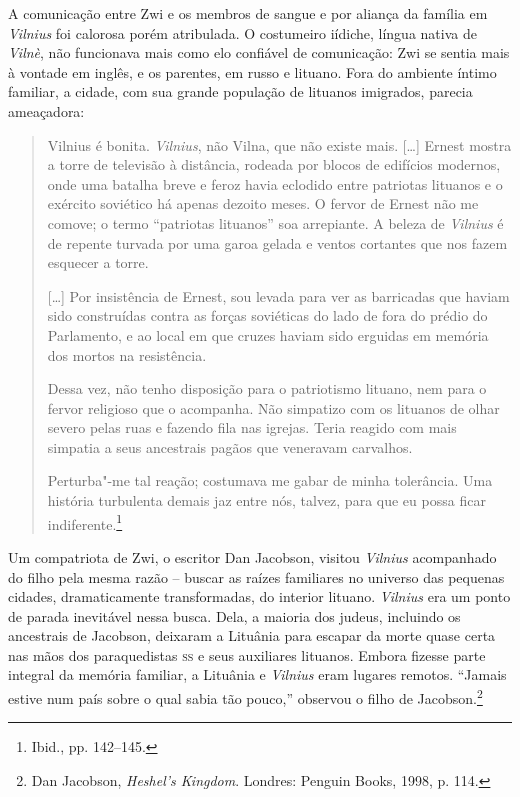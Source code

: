 A comunicação entre Zwi e os membros de sangue e por aliança da família
em \textit{Vilnius} foi calorosa porém atribulada. O costumeiro iídiche, língua
nativa de \textit{Vilnè}, não funcionava mais como elo confiável de comunicação:
Zwi se sentia mais à vontade em inglês, e os parentes, em russo e
lituano. Fora do ambiente íntimo familiar, a cidade, com sua grande
população de lituanos imigrados, parecia ameaçadora:

\begin{quote}
Vilnius é bonita. \textit{Vilnius}, não Vilna, que não existe mais.
[\ldots{}] Ernest mostra a torre de televisão à distância, rodeada por
blocos de edifícios modernos, onde uma batalha breve e feroz havia
eclodido entre patriotas lituanos e o exército soviético há apenas
dezoito meses. O fervor de Ernest não me comove; o termo ``patriotas
lituanos'' soa arrepiante. A beleza de \textit{Vilnius} é de repente turvada por
uma garoa gelada e ventos cortantes que nos fazem esquecer a torre.

[\ldots{}] Por insistência de Ernest, sou levada para ver as barricadas
que haviam sido construídas contra as forças soviéticas do lado de fora
do prédio do Parlamento, e ao local em que cruzes haviam sido erguidas
em memória dos mortos na resistência.

Dessa vez, não tenho disposição para o patriotismo lituano, nem para o
fervor religioso que o acompanha. Não simpatizo com os lituanos de olhar
severo pelas ruas e fazendo fila nas igrejas. Teria reagido com mais
simpatia a seus ancestrais pagãos que veneravam carvalhos.

Perturba"-me tal reação; costumava me gabar de minha tolerância. Uma
história turbulenta demais jaz entre nós, talvez, para que eu possa
ficar indiferente.\footnote{Ibid., pp. 142--145.}
\end{quote}

Um compatriota de Zwi, o escritor Dan Jacobson, visitou \textit{Vilnius}
acompanhado do filho pela mesma razão -- buscar as raízes familiares no
universo das pequenas cidades, dramaticamente transformadas, do interior
lituano. \textit{Vilnius} era um ponto de parada inevitável nessa busca. Dela, a
maioria dos judeus, incluindo os ancestrais de Jacobson, deixaram a
Lituânia para escapar da morte quase certa nas mãos dos paraquedistas
\textsc{ss} e seus auxiliares lituanos. Embora fizesse parte integral da memória
familiar, a Lituânia e \textit{Vilnius} eram lugares remotos. ``Jamais estive num
país sobre o qual sabia tão pouco,'' observou o filho de
Jacobson.\footnote{Dan Jacobson, \textit{Heshel's Kingdom}. Londres: Penguin Books, 1998, p. 114.}

